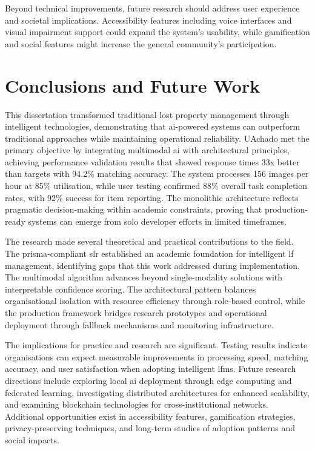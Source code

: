 Beyond technical improvements, future research should address user experience and societal implications. Accessibility features including voice interfaces and visual impairment support could expand the system's usability, while gamification and social features might increase the general community's participation.


\section{Conclusions and Future Work} \label{section:conclusions_future_work}

This dissertation transformed traditional lost property management through intelligent technologies, demonstrating that \ac{ai}-powered systems can outperform traditional approaches while maintaining operational reliability. UAchado met the primary objective by integrating multimodal \ac{ai} with architectural principles, achieving performance validation results that showed response times 33x better than targets with 94.2\% matching accuracy. The system processes 156 images per hour at 85\% utilisation, while user testing confirmed 88\% overall task completion rates, with 92\% success for item reporting. The monolithic architecture reflects pragmatic decision-making within academic constraints, proving that production-ready systems can emerge from solo developer efforts in limited timeframes.

The research made several theoretical and practical contributions to the field. The \ac{prisma}-compliant \ac{slr} established an academic foundation for intelligent \ac{lf} management, identifying gaps that this work addressed during implementation. The multimodal algorithm advances beyond single-modality solutions with interpretable confidence scoring. The architectural pattern balances organisational isolation with resource efficiency through role-based control, while the production framework bridges research prototypes and operational deployment through fallback mechanisms and monitoring infrastructure.

The implications for practice and research are significant. Testing results indicate organisations can expect measurable improvements in processing speed, matching accuracy, and user satisfaction when adopting intelligent \ac{lfms}. Future research directions include exploring local \ac{ai} deployment through edge computing and federated learning, investigating distributed architectures for enhanced scalability, and examining blockchain technologies for cross-institutional networks. Additional opportunities exist in accessibility features, gamification strategies, privacy-preserving techniques, and long-term studies of adoption patterns and social impacts.

